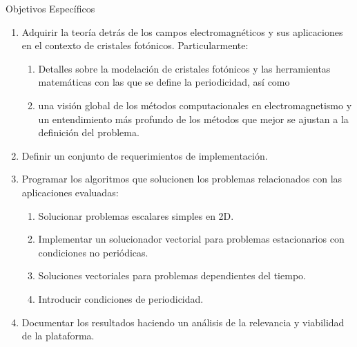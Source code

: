 \documentclass[xcolor=table,serif]{beamer}
\begin{document}
		\begin{frame}
		\begin{block}{Objetivos Espec\'ificos}
	    \pause
	    \begin{enumerate}
			\item  Adquirir la teoría detrás de los campos electromagnéticos y sus aplicaciones en el contexto de cristales fotónicos. Particularmente: 
			\pause
			\begin{enumerate}
				\item Detalles sobre la modelación de cristales fotónicos y las herramientas matemáticas con las que se define la periodicidad, así como \pause
	 			\item  una visión global de los métodos computacionales en electromagnetismo y un entendimiento más profundo de los métodos que mejor se ajustan a la definición del problema.
	 		\end{enumerate}
			\pause
			\item Definir un conjunto de requerimientos de implementación. 
			\pause
			\item Programar los algoritmos que solucionen los problemas relacionados con las aplicaciones evaluadas:
				\begin{enumerate}
					\pause
					\item Solucionar problemas escalares simples en 2D.	\pause
					\item Implementar un solucionador vectorial para problemas estacionarios con condiciones no periódicas.
					\pause
					\item Soluciones vectoriales para problemas dependientes del tiempo.
					\pause
					\item Introducir condiciones de periodicidad.
				\end{enumerate}
			\pause
			\item Documentar los resultados haciendo un análisis de la relevancia y viabilidad de la plataforma.
		\end{enumerate}
		\end{block}
	\end{frame}
\end{document}
